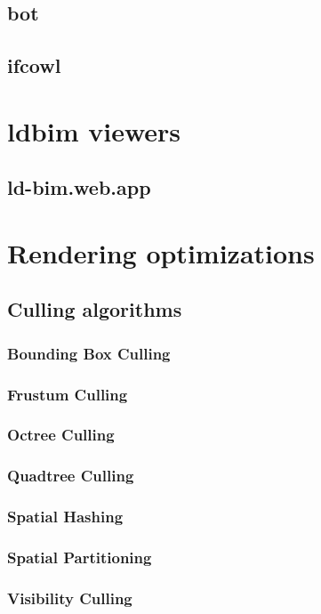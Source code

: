 \documentclass[12pt,a4paper,faculty=ea,language=en,doctype=report]{ugent-doc}
\begin{document}
    \subsection{\acs{bot}}
    \subsection{\acs{ifcowl}}    
  
  \section{\acs{ldbim} viewers}
    \subsection{ld-bim.web.app}

  \section{Rendering optimizations}
    \subsection{Culling algorithms}
      \subsubsection{Bounding Box Culling}
      \subsubsection{Frustum Culling}
      \subsubsection{Octree Culling}
      \subsubsection{Quadtree Culling}
      \subsubsection{Spatial Hashing}
      \subsubsection{Spatial Partitioning}
      \subsubsection{Visibility Culling}
\end{document}
